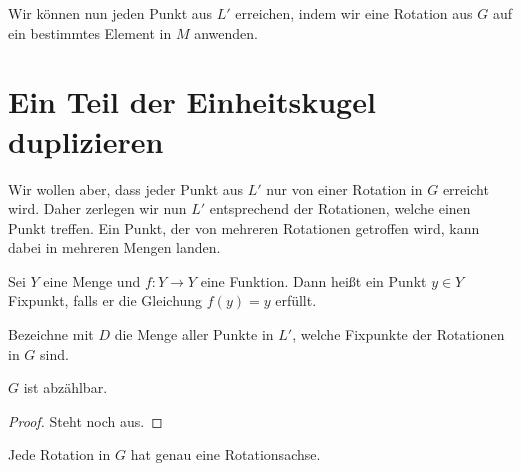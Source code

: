 Wir können nun jeden Punkt aus $L'$ erreichen, indem wir eine Rotation aus $G$ auf ein bestimmtes Element in $M$ anwenden.

\section{Ein Teil der Einheitskugel duplizieren}

Wir wollen aber, dass jeder Punkt aus $L'$ nur von einer Rotation in $G$ erreicht wird. Daher zerlegen wir nun $L'$ entsprechend
der Rotationen, welche einen Punkt treffen. Ein Punkt, der von mehreren Rotationen getroffen wird, kann dabei in mehreren Mengen landen.


\begin{definition}[Fixpunkte] \label{def:fixpunkte}
Sei $Y$ eine Menge und $f:Y\rightarrow Y$ eine Funktion. Dann heißt ein Punkt $y\in Y$ Fixpunkt, falls er die Gleichung $f(y)=y$
erfüllt.
\leanok {}
\end{definition}

\begin{definition} \label{def:menge_fixpunkte} 
Bezeichne mit $D$ die Menge aller Punkte in $L'$, welche Fixpunkte der Rotationen in $G$ sind.
\leanok {}
\end{definition}

\begin{lemma} \label{lemma:G_abzaehlbar}
$G$ ist abzählbar.
 \leanok
\end{lemma}
\begin{proof} 
Steht noch aus.
\end{proof}

\begin{definition} \label{lemma:eine_rot_achse}
Jede Rotation in $G$ hat genau eine Rotationsachse.
 \leanok {}
\end{definition}


